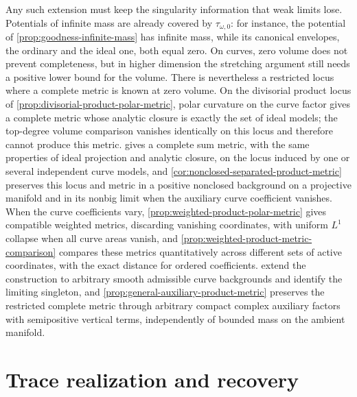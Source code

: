 Any such extension must keep the singularity information that weak limits lose. Potentials of infinite mass are already covered by $\tau_{\omega,0}$: for instance, the potential of \cref{prop:goodness-infinite-mass} has infinite mass, while its canonical envelopes, the ordinary and the ideal one, both equal zero. On curves, zero volume does not prevent completeness, but in higher dimension the stretching argument still needs a positive lower bound for the volume. There is nevertheless a restricted locus where a complete metric is known at zero volume. On the divisorial product locus of \cref{prop:divisorial-product-polar-metric}, polar curvature on the curve factor gives a complete metric whose analytic closure is exactly the set of ideal models; the top-degree volume comparison vanishes identically on this locus and therefore cannot produce this metric.  gives a complete sum metric, with the same properties of ideal projection and analytic closure, on the locus induced by one or several independent curve models, and \cref{cor:nonclosed-separated-product-metric} preserves this locus and metric in a positive nonclosed background on a projective manifold and in its nonbig limit when the auxiliary curve coefficient vanishes. When the curve coefficients vary, \cref{prop:weighted-product-polar-metric} gives compatible weighted metrics, discarding vanishing coordinates, with uniform $L^1$ collapse when all curve areas vanish, and \cref{prop:weighted-product-metric-comparison} compares these metrics quantitatively across different sets of active coordinates, with the exact distance for ordered coefficients.  extend the construction to arbitrary smooth admissible curve backgrounds and identify the limiting singleton, and \cref{prop:general-auxiliary-product-metric} preserves the restricted complete metric through arbitrary compact complex auxiliary factors with semipositive vertical terms, independently of bounded mass on the ambient manifold.

\section{Trace realization and recovery}

